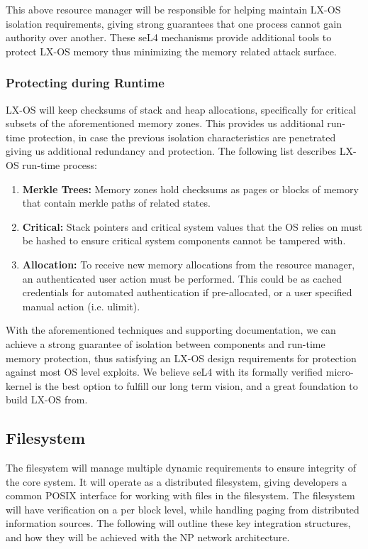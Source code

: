 \documentclass[11pt]{article}
\begin{document}
\noindent This above resource manager will be responsible for helping maintain LX-OS isolation requirements, giving strong guarantees that one process cannot gain authority over another.
These seL4 mechanisms provide additional tools to protect LX-OS memory thus minimizing the memory related attack surface.


\subsubsection{Protecting during Runtime}

\noindent LX-OS will keep checksums of stack and heap allocations, specifically for critical subsets of the aforementioned memory zones.
This provides us additional run-time protection, in case the previous isolation characteristics are penetrated giving us additional redundancy and protection.
The following list describes LX-OS run-time process:

\begin{enumerate}
    \item \textbf{Merkle Trees:} Memory zones hold checksums as pages or blocks of memory that contain merkle paths of related states.
    \item \textbf{Critical:} Stack pointers and critical system values that the OS relies on must be hashed to ensure critical system components cannot be tampered with.
    \item \textbf{Allocation:} To receive new memory allocations from the resource manager, an authenticated user action must be performed. This could be as cached credentials for automated authentication if pre-allocated, or a user specified manual action (i.e. ulimit).
\end{enumerate}

\noindent With the aforementioned techniques and supporting documentation, we can achieve a strong guarantee of isolation between components and run-time memory protection, thus satisfying an LX-OS design requirements for protection against most OS level exploits.
We believe seL4 with its formally verified micro-kernel is the best option to fulfill our long term vision, and a great foundation to build LX-OS from.

\subsection{Filesystem}

The filesystem will manage multiple dynamic requirements to ensure integrity of the core system.
It will operate as a distributed filesystem, giving developers a common POSIX interface for working with files in the filesystem.
The filesystem will have verification on a per block level, while handling paging from distributed information sources. 
The following will outline these key integration structures, and how they will be achieved with the NP network architecture.
\end{document}
